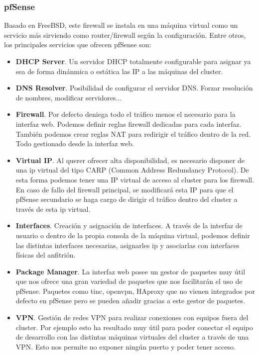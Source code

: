 		\subsubsection{pfSense}
			\begin{paragraph}
				Basado en FreeBSD, este firewall se instala en una máquina virtual como un servicio más sirviendo como router/firewall según la configuración. Entre otros, los principales servicios que ofrecen pfSense son:
				\begin{itemize}
					\item \textbf{DHCP Server}. Un servidor DHCP totalmente configurable para asignar ya sea de forma dinánmica o estática las IP a las máquinas del cluster.
					\item \textbf{DNS Resolver}. Posibilidad de configurar el servidor DNS. Forzar resolución de nombres, modificar servidores...
					\item \textbf{Firewall}. Por defecto deniega todo el tráfico menos el necesario para la interfaz web. Podemos definir reglas firewall dedicadas para cada interfaz. También podemos crear reglas NAT para redirigir el tráfico dentro de la red. Todo gestionado desde la interfaz web.
					\item \textbf{Virtual IP}. Al querer ofrecer alta disponibilidad, es necesario disponer de una ip virtual del tipo CARP (Common Address Redundancy Protocol). De esta forma podemos tener una IP virtual de acceso al cluster para los firewall. En caso de fallo del firewall principal, se modificará esta IP para que el pfSense secundario se haga cargo de dirigir el tráfico dentro del cluster a través de esta ip virtual.
					\item \textbf{Interfaces}. Creación y asignación de interfaces. A través de la interfaz de usuario o dentro de la propia consola de la máquina virtual, podemos definir las distintas interfaces necesarias, asignarles ip y asociarlas con interfaces físicas del anfitrión.
					\item \textbf{Package Manager}. La interfaz web posee un gestor de paquetes muy útil que nos ofrece una gran variedad de paquetes que nos facilitarán el uso de pfSense. Paquetes como tinc, openvpn, HAproxy que no vienen integrados por defecto en pfSense pero se pueden añadir gracias a este gestor de paquetes.
					\item \textbf{VPN}. Gestión de redes VPN para realizar conexiones con equipos fuera del cluster. Por ejemplo esto ha resultado muy útil para poder conectar el equipo de desarrollo con las distintas máquinas virtuales del cluster a través de una VPN. Esto nos permite no exponer ningún puerto y poder tener acceso.

\end{itemize}
\end{paragraph}
